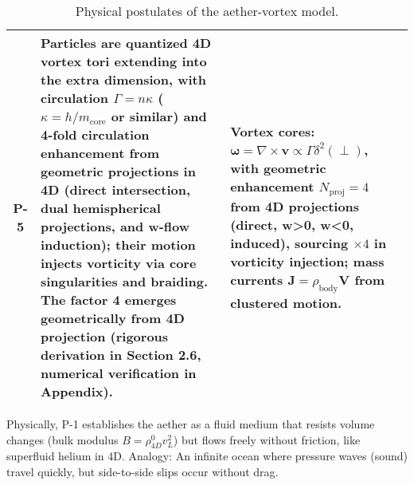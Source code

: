 \documentclass{article}
\begin{document}
\begin{table}[H]
\begin{tabularx}{\textwidth}{|c|Y|Y|}
\hline
\textbf{P-5} & Particles are \textbf{quantized 4D vortex tori} extending into the extra dimension, with circulation $\Gamma = n \kappa$ ($\kappa = h / m_{\text{core}}$ or similar) and 4-fold circulation enhancement from geometric projections in 4D (direct intersection, dual hemispherical projections, and w-flow induction); their motion injects vorticity via core singularities and braiding. The factor 4 emerges geometrically from 4D projection (rigorous derivation in Section 2.6, numerical verification in Appendix). & Vortex cores: $\boldsymbol{\omega} = \nabla \times \mathbf{v} \propto \Gamma \delta^2(\perp)$, with geometric enhancement $N_{\text{proj}}=4$ from 4D projections (direct, w>0, w<0, induced), sourcing $\times 4$ in vorticity injection; mass currents $\mathbf{J} = \rho_{\text{body}} \mathbf{V}$ from clustered motion. \\
\hline
\end{tabularx}
\caption{Physical postulates of the aether-vortex model.\protect\footnotemark}
\label{tab:postulates}
\end{table}


Physically, P-1 establishes the aether as a fluid medium that resists volume changes (bulk modulus $B = \rho_{4D}^0 v_L^2$) but flows freely without friction, like superfluid helium in 4D. Analogy: An infinite ocean where pressure waves (sound) travel quickly, but side-to-side slips occur without drag.
\end{document}
